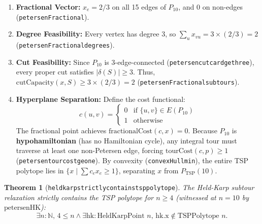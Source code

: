 \documentclass[11pt,a4paper]{article}
\renewcommand{\_}{\origunderscore\allowbreak}
\theoremstyle{plain}
\newtheorem{theorem}{Theorem}[section]
\theoremstyle{definition}
\theoremstyle{remark}
\begin{document}
\begin{enumerate}
  \item \textbf{Fractional Vector:} $x_e = 2/3$ on all 15 edges of $P_{10}$, and $0$ on non-edges (\texttt{petersenFractional}).
  \item \textbf{Degree Feasibility:} Every vertex has degree 3, so $\sum_{u} x_{vu} = 3 \times (2/3) = 2$ (\texttt{petersenFractional\_degrees}).
  \item \textbf{Cut Feasibility:} Since $P_{10}$ is 3-edge-connected (\texttt{petersen\_cut\_card\_ge\_three}), every proper cut satisfies $|\delta(S)| \ge 3$. Thus, $\text{cutCapacity}(x, S) \ge 3 \times (2/3) = 2$ (\texttt{petersenFractional\_subtours}).
  \item \textbf{Hyperplane Separation:} Define the cost functional:
  \begin{equation}
    c(u, v) = \begin{cases} 0 & \text{if } \{u, v\} \in E(P_{10}) \\ 1 & \text{otherwise} \end{cases}
  \end{equation}
  The fractional point achieves $\text{fractionalCost}(c, x) = 0$. Because $P_{10}$ is \textbf{hypohamiltonian} (has no Hamiltonian cycle), any integral tour must traverse at least one non-Petersen edge, forcing $\text{tourCost}(c, p) \ge 1$ (\texttt{petersen\_tour\_cost\_ge\_one}).
  By convexity (\texttt{convexHull\_min}), the entire TSP polytope lies in $\{ x \mid \sum c_e x_e \ge 1 \}$, separating $x$ from $P_{\text{TSP}}(10)$.
\end{enumerate}

\begin{theorem}[\texttt{held\_karp\_strictly\_contains\_tsp\_polytope}]
The Held-Karp subtour relaxation strictly contains the TSP polytope for $n \ge 4$ (witnessed at $n = 10$ by $\text{petersenHK}$):
\begin{equation*}
  \exists n : \mathbb{N},\, 4 \le n \land \exists \text{hk} : \text{HeldKarpPoint } n,\, \text{hk.x} \notin \text{TSPPolytope } n.
\end{equation*}
\end{theorem}
\end{document}
